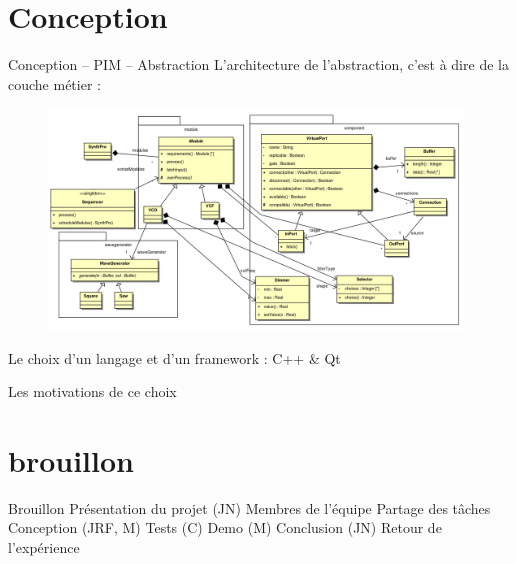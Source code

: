 \documentclass[frenchb]{beamer}
\begin{document}
\section{Conception}
\begin{frame}{Conception -- PIM -- Abstraction}
L'architecture de l'abstraction, c'est à dire de la couche métier :
    \begin{figure}
        \includegraphics[width=11cm ]{../img/ps/business-pim-light.pdf}
    \end{figure}
\end{frame}

\begin{frame}{Le choix d'un langage et d'un framework : C++ \& Qt}
    \begin{block}{Les motivations de ce choix}
    \end{block}

\end{frame}
\section{brouillon}
\begin{frame}{Brouillon}
Présentation du projet (JN)
Membres de l'équipe
Partage des tâches
Conception (JRF, M)
Tests (C)
Demo (M)
Conclusion (JN)
Retour de l'expérience
\end{frame}
\end{document}
